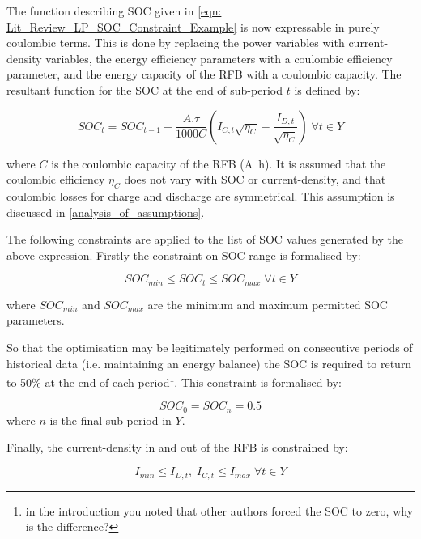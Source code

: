 \documentclass[preprint,3p,review,authoryear,10pt]{elsarticle}
\newcommand{\sol}[1]{\footnote{#1}\marginpar{\fbox{\thefootnote}}}
\begin{document}
The function describing SOC given in \cref{eqn: Lit_Review_LP_SOC_Constraint_Example} is now expressable in purely coulombic terms. This is done by replacing the power variables with current-density variables, the energy efficiency parameters with a coulombic efficiency parameter, and the energy capacity of the RFB with a coulombic capacity. The resultant function for the SOC at the end of sub-period $t$ is defined by:

\begin{equation}
\label{eqn: Method_SOC_Tracker}
SOC_t = SOC_{t-1} + \frac{A.\tau}{1000C}(I_{C,t}\sqrt{\eta_C} - \frac{I_{D,t}}{\sqrt{\eta_C}}) \; \forall t \in Y
\end{equation}

where $C$ is the coulombic capacity of the RFB (\si{\ampere\hour}). It is assumed that the coulombic efficiency $\eta_C$ does not vary with SOC or current-density, and that coulombic losses for charge and discharge are symmetrical. This assumption is discussed in \cref{analysis_of_assumptions}. 

The following constraints are applied to the list of SOC values generated by the above expression. Firstly the constraint on SOC range is formalised by:

\begin{equation}
\label{eqn: Method_Constraint_SOC_Range}
SOC_{min} \leq SOC_t \leq SOC_{max} \; \forall t \in Y
\end{equation}

where $SOC_{min}$ and $SOC_{max}$ are the minimum and maximum permitted SOC parameters.

So that the optimisation may be legitimately performed on consecutive periods of historical data (i.e. maintaining an energy balance) the SOC is required to return to 50\% at the end of each period\sol{in the introduction you noted that other authors forced the SOC to zero, why is the difference?}. This constraint is formalised by:

\begin{equation}
\label{eqn: Method_Constraint_E_Conservation}
SOC_0 = SOC_n = 0.5
\end{equation}
where $n$ is the final sub-period in $Y$.

Finally, the current-density in and out of the RFB is constrained by:

\begin{equation}
\label{eqn: Method_Constraint_Ia}
I_{min} \leq I_{D,t}, \; I_{C,t} \leq I_{max} \; \forall t \in Y
\end{equation}
\end{document}
